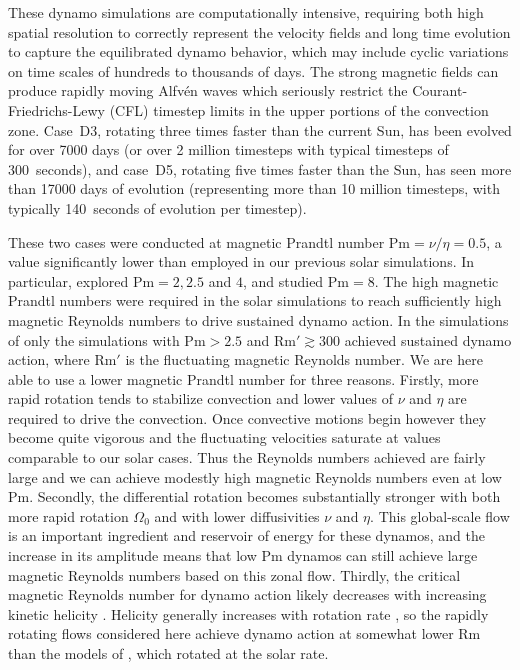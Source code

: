 These dynamo simulations are computationally intensive, requiring both
high spatial resolution to correctly represent the velocity fields and long
time evolution to capture the equilibrated dynamo behavior, which may
include cyclic variations on time scales of hundreds to thousands of days.  The strong
magnetic fields can produce rapidly moving Alfv\'en waves which
seriously restrict the Courant-Friedrichs-Lewy (CFL) timestep limits
in the upper portions of the convection zone.  Case~D3, rotating three
times faster than the current Sun, has been evolved for over 7000 days
(or over 2 million timesteps with typical timesteps of 300~seconds), and case~D5, rotating five times faster
than the Sun, has seen more than 17000 days of evolution (representing
more than 10 million timesteps, with typically 140~seconds of evolution per timestep).

These two cases were conducted at magnetic Prandtl number $\mathrm{Pm}
= \nu/\eta =0.5$, a value significantly lower than employed in our
previous solar simulations.  In particular, \cite{Brun_et_al_2004}
explored $\mathrm{Pm} =2,2.5$ and $4$, and \cite{Browning_et_al_2006}
studied $\mathrm{Pm}=8$.  The high magnetic Prandtl numbers were
required in the solar simulations to reach sufficiently high magnetic
Reynolds numbers to drive sustained dynamo action.  In the simulations
of \cite{Brun_et_al_2004} only the simulations with $\mathrm{Pm} >2.5$
and $\mathrm{Rm}' \gtrsim 300$ achieved sustained dynamo action, where
$\mathrm{Rm}'$ is the fluctuating magnetic Reynolds number.  We are
here able to use a lower magnetic Prandtl number for three reasons.
Firstly, more rapid rotation tends to stabilize convection and lower
values of $\nu$ and $\eta$ are required to drive the convection.  Once
convective motions begin however they become quite vigorous and the
fluctuating velocities saturate at values comparable to our solar
cases.  Thus the Reynolds numbers achieved are fairly large and we can
achieve modestly high magnetic Reynolds numbers even at low
$\mathrm{Pm}$.  Secondly, the differential rotation becomes
substantially stronger with both more rapid rotation $\Omega_0$ and
with lower diffusivities $\nu$ and $\eta$.  This global-scale flow is
an important ingredient and reservoir of energy for these dynamos, and
the increase in its amplitude means that low $\mathrm{Pm}$ dynamos can
still achieve large magnetic Reynolds numbers based on this zonal
flow.  Thirdly, the critical magnetic Reynolds number for dynamo action
likely decreases with increasing kinetic helicity
\citep[e.g.,][]{Leorat_et_al_1981}.  Helicity generally increases with
rotation rate \citep[e.g.,][]{Kapyla_et_al_2009}, so the rapidly
rotating flows considered here achieve dynamo action at somewhat lower
$\mathrm{Rm}$ than the models of \cite{Brun_et_al_2004}, which rotated
at the solar rate.



